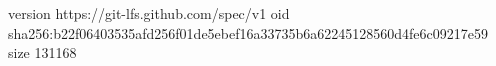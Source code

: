 version https://git-lfs.github.com/spec/v1
oid sha256:b22f06403535afd256f01de5ebef16a33735b6a62245128560d4fe6c09217e59
size 131168
